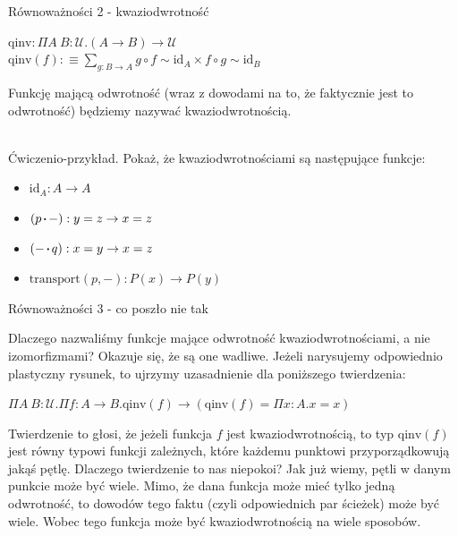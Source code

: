 \documentclass{beamer}
\newcommand{\defn}{:\equiv}
\newcommand{\U}{\mathcal{U}}
\newcommand{\id}{\text{id}}
\newcommand{\comp}{\circ}
\newcommand{\sq}{\mathbin{\vcenter{\hbox{\rule{.3ex}{.3ex}}}}}
\newcommand{\transport}{\text{transport}}
\newcommand{\qinv}{\text{qinv}}
\begin{document}
\begin{frame}{Równoważności 2 - kwaziodwrotność}

\begin{definition}
$\qinv : \Pi A\ B : \U. (A \to B) \to \U$ \\
$\displaystyle \qinv(f) \defn \sum_{g : B \to A} g \comp f \sim \id_A \times f \comp g \sim \id_B$
\end{definition}

Funkcję mającą odwrotność (wraz z dowodami na to, że faktycznie jest to odwrotność) będziemy nazywać kwaziodwrotnością. \\~\

Ćwiczenio-przykład. Pokaż, że kwaziodwrotnościami są następujące funkcje:
\begin{itemize}
	\item $\id_A : A \to A$
	\item $(p \sq -) : y = z \to x = z$
	\item $(- \sq q) : x = y \to x = z$
	\item $\transport(p, -) : P(x) \to P(y)$
\end{itemize}

\end{frame}

\begin{frame}{Równoważności 3 - co poszło nie tak}

Dlaczego nazwaliśmy funkcje mające odwrotność kwaziodwrotnościami, a nie izomorfizmami? Okazuje się, że są one wadliwe. Jeżeli narysujemy odpowiednio plastyczny rysunek, to ujrzymy uzasadnienie dla poniższego twierdzenia:

\begin{theorem}

$\Pi A\ B : \U. \Pi f : A \to B. \qinv(f) \to (\qinv(f) = \Pi x : A. x = x)$

\end{theorem}

Twierdzenie to głosi, że jeżeli funkcja $f$ jest kwaziodwrotnością, to typ $\qinv(f)$ jest równy typowi funkcji zależnych, które każdemu punktowi przyporządkowują jakąś pętlę. Dlaczego twierdzenie to nas niepokoi? Jak już wiemy, pętli w danym punkcie może być wiele. Mimo, że dana funkcja może mieć tylko jedną odwrotność, to dowodów tego faktu (czyli odpowiednich par ścieżek) może być wiele. Wobec tego funkcja może być kwaziodwrotnością na wiele sposobów.

\end{frame}
\end{document}

